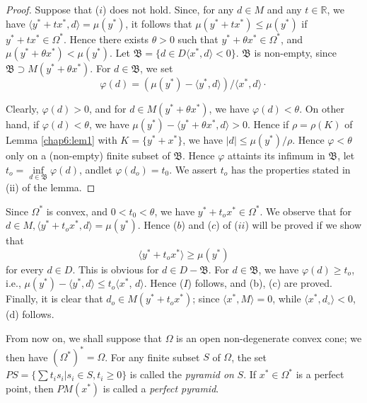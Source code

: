 \begin{proof}
  Suppose that ($i$) does not hold. Since, for any $d \in M$ and any $t
  \in \mathbb{R}$, we have $\langle y^* + tx^* , d \rangle = \mu (y^*)$,
  it follows that $\mu (y^* + tx^*)\leq \mu (y^*)$ if $ y^* + tx^* \in
  \Omega^*$. Hence there exists $\theta > 0$ such that $ y^* + \theta x^*
  \in \Omega^*$, and $\mu (y^* + \theta x^*) < \mu (y^*)$. Let $\mathfrak{B} =
  \Bigg\{ d \in D \langle x^*, d\rangle < 0\Bigg\}$. $\mathfrak{B}$ is
  non-empty, since $ \mathfrak{B} \supset M(y^* + \theta x^*)$. For $d
  \in \mathfrak{B}$, we set  
  $$
  \varphi (d) = (\mu (y^*) - \langle y^* , d \rangle )/ \langle x^*, d
  \rangle \cdot 
  $$
  
  Clearly, $\varphi (d) > 0$, and for $d \in M(y^* + \theta x^*
  )$, we have $\varphi(d) < \theta$. On other hand, if $\varphi(d) <
  \theta $, we have $ \mu (y^*) - \langle y^* + \theta x^* , d\rangle
  >0$. Hence if $\rho = \rho (K)$ of Lemma \ref{chap6:lem1} with $K = \Big\{ y^*
  + x^* \Big\}$, we have $|d|\leq \mu(y^*)/\rho $. Hence $\varphi <
  \theta$ only on a (non-empty) finite subset of $\mathfrak{B}$. Hence
  $\varphi$ attaints its infimum in $\mathfrak{B}$, let $t_o=
  \inf\limits_{d \in \mathfrak{B}}\varphi (d)$, and\pageoriginale let
  $\varphi (d_o) =  t_0$. We assert $t_o$ has the properties stated in
  (ii) of the lemma.  
\end{proof}

Since $\Omega^*$ is convex, and $0 < t_0 < \theta$, we have $y^* +
t_o x^*\in \Omega^*$. We observe that for $d \in M, \langle y^* + t_o
x^* , d \rangle = \mu (y^*)$. Hence ($b$) and ($c$) of ($ii$) will be
proved if we show that  
\begin{equation*}
  \langle y^* + t_o x^* \rangle \geq \mu (y^*) \tag{I}
\end{equation*}
for every $d \in D$. This is obvious for $d \in D - \mathfrak{B}$. For
$d \in \mathfrak{B}$, we have $\varphi (d)\geq t_o$, i.e., $\mu (y^*)
- \langle y^* , d \rangle \leq t_o \langle x^*$, $d \rangle$. Hence ($I$)
follows, and (b), (c) are proved. Finally, it is clear that $d_o
\in M(y^* + t_o x^*)$; since $\langle x^*, M \rangle = 0$, while
$\langle x^*, d_\circ \rangle <0$, (d) follows.  

From now on, we shall suppose that $\Omega$ is an open non-degenerate
convex cone; we then have $(\Omega^*)^* = \Omega$. For any finite
subset $S$ of $\Omega$, the set $PS = \bigg\{ \sum t_i s_i | s_i \in
S, t_i \geq 0 \bigg \}$ is called the \textit{pyramid on} $S$. If $x^*
\in \Omega^*$ is a perfect point, then $PM(x^*)$ is called a 
\textit{perfect pyramid}. 

